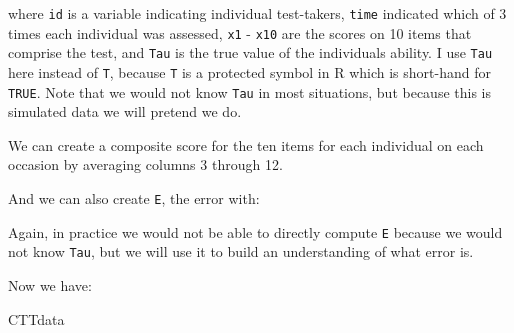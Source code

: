 \documentclass[
]{book}
\newenvironment{Shaded}{\begin{snugshade}}{\end{snugshade}}
\newcommand{\DecValTok}[1]{\textcolor[rgb]{0.00,0.00,0.81}{#1}}
\newcommand{\FunctionTok}[1]{\textcolor[rgb]{0.00,0.00,0.00}{#1}}
\newcommand{\NormalTok}[1]{#1}
\newcommand{\OtherTok}[1]{\textcolor[rgb]{0.56,0.35,0.01}{#1}}
\newcommand{\SpecialCharTok}[1]{\textcolor[rgb]{0.00,0.00,0.00}{#1}}
\begin{document}
where \texttt{id} is a variable indicating individual test-takers, \texttt{time} indicated which of 3 times each individual was assessed, \texttt{x1} - \texttt{x10} are the scores on 10 items that comprise the test, and \texttt{Tau} is the true value of the individuals ability.
I use \texttt{Tau} here instead of \texttt{T}, because \texttt{T} is a protected symbol in R which is short-hand for \texttt{TRUE}.
Note that we would not know \texttt{Tau} in most situations, but because this is simulated data we will pretend we do.

We can create a composite score for the ten items for each individual on each occasion by averaging columns 3 through 12.

\begin{Shaded}
\end{Shaded}

And we can also create \texttt{E}, the error with:

\begin{Shaded}
\end{Shaded}

Again, in practice we would not be able to directly compute \texttt{E} because we would not know \texttt{Tau}, but we will use it to build an understanding of what error is.

Now we have:

\begin{Shaded}
\begin{Highlighting}[]
\NormalTok{CTTdata}
\end{Highlighting}
\end{Shaded}
\end{document}
